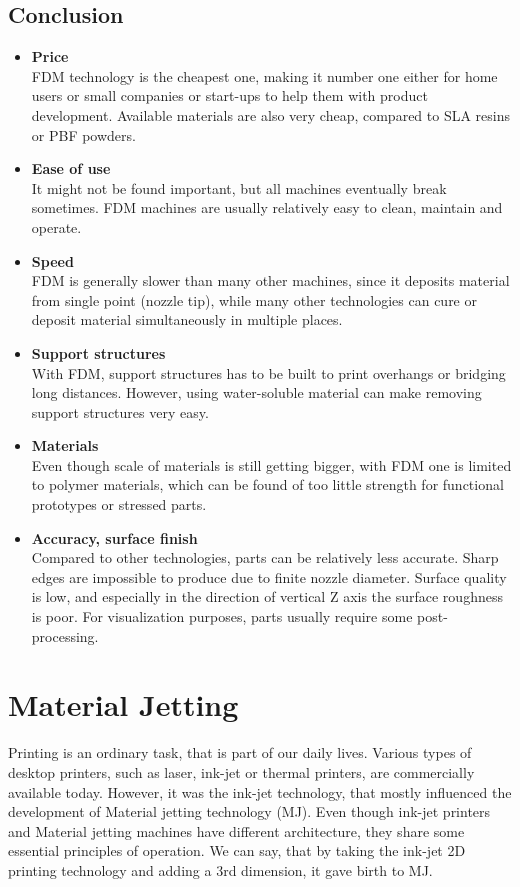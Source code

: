 \documentclass[a4paper, twoside, 11pt]{report}
\newcommand\pro{\item[$+$]}
\newcommand\con{\item[$-$]}
\begin{document}
\section{Conclusion}
\begin{itemize}
\pro \textbf{Price}\\
FDM technology is the cheapest one, making it number one either for home users or small companies or start-ups to help them with product development. Available materials are also very cheap, compared to SLA resins or PBF powders.

\pro \textbf{Ease of use}\\
It might not be found important, but all machines eventually break sometimes. FDM machines are usually relatively easy to clean, maintain and operate.
\\[10pt]



\con \textbf{Speed}\\
FDM is generally slower than many other machines, since it deposits material from single point (nozzle tip), while many other technologies can cure or deposit material simultaneously in multiple places.

\con \textbf{Support structures}\\
With FDM, support structures has to be built to print overhangs or bridging long distances. However, using water-soluble material can make removing support structures very easy.

\con \textbf{Materials}\\
Even though scale of materials is still getting bigger, with FDM one is limited to polymer materials, which can be found of too little strength for functional prototypes or stressed parts.

\con \textbf{Accuracy, surface finish}\\
Compared to other technologies, parts can be relatively less accurate. Sharp edges are impossible to produce due to finite nozzle diameter. Surface quality is low, and especially in the direction of vertical Z axis the surface roughness is poor. For visualization purposes, parts usually require some post-processing.
\end{itemize}

\chapter{Material Jetting}

Printing is an ordinary task, that is part of our daily lives. Various types of desktop printers, such as laser, ink-jet or thermal printers, are commercially available today. However, it was the ink-jet technology, that mostly influenced the development of Material jetting technology (MJ). Even though ink-jet printers and Material jetting machines have different architecture, they share some essential principles of operation. We can say, that by taking the ink-jet 2D printing technology and adding a 3rd dimension, it gave birth to MJ.
\end{document}
